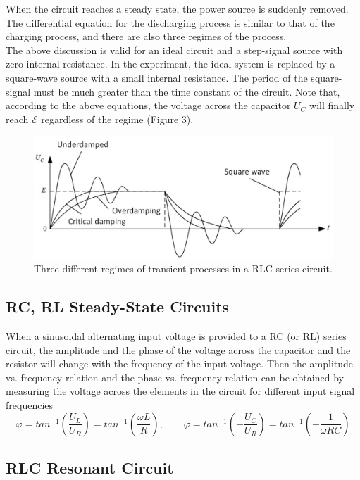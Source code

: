 \documentclass{article}
\begin{document}
When the circuit reaches a steady state, the power source is suddenly removed. The differential equation for the discharging process is similar to that of the charging process, and there are also three regimes of the process.\\

The above discussion is valid for an ideal circuit and a step-signal source with zero internal resistance. In the experiment, the ideal system is replaced by a square-wave source with a small internal resistance. The period of the square-signal must be much greater than the time constant of the circuit. Note that, according to the above equations, the voltage across the capacitor $ U_C $ will finally reach $ \mathcal{E} $ regardless of the regime (Figure 3).

\begin{figure}[H]
	\centering
	\includegraphics[scale=0.4]{fig3.jpg}
	\caption{Three different regimes of transient processes in a RLC series circuit.}
\end{figure}

\subsection{RC, RL Steady-State Circuits}
When a sinusoidal alternating input voltage is provided to a RC (or RL) series circuit, the amplitude and the phase of the voltage across the capacitor and the resistor will change with the frequency of the input voltage. Then the amplitude vs. frequency relation and the phase vs. frequency relation can be obtained by measuring the voltage across the elements in the circuit for different input signal frequencies
$$ \varphi=tan^{-1}\left(\dfrac{U_L}{U_R}\right)=tan^{-1}\left(\dfrac{\omega L}{R}\right),\qquad \varphi=tan^{-1}\left(-\dfrac{U_C}{U_R}\right)=tan^{-1}\left(-\dfrac{1}{\omega RC}\right) $$

\subsection{RLC Resonant Circuit}
\end{document}
